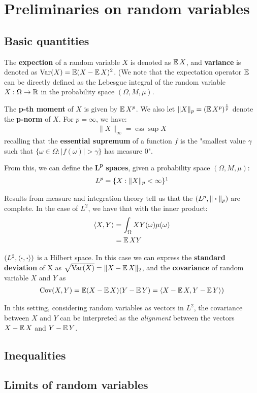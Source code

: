 \section{Preliminaries on random variables}
\subsection{Basic quantities}

The \textbf{expection} of a random variable $X$ is denoted as $\operatorname{\mathbb{E}} X$, and \textbf{variance} is denoted as $\operatorname{Var}(X) = \operatorname{\mathbb{E}} (X - \operatorname{\mathbb{E}} X)^2$. (We note that the expectation operator $\operatorname{\mathbb{E}}$ can be directly defined as the Lebesgue integral of the random variable $X: \Omega \rightarrow \mathbb{R}$ in the probability space $(\Omega, M, \mu)$.

The \textbf{p-th moment} of $X$ is given by $\operatorname{\mathbb{E}} X^p$. We also let $\|X\|_p = ( \operatorname{\mathbb{E}} X^p )^{\frac{1}{p}}$ denote the \textbf{p-norm} of $X$. For $p=\infty$, we have:
\begin{align}
    \|X\|_\infty = \operatorname{ess}\operatorname{sup}X \nonumber
\end{align}
recalling that the \textbf{essential supremum} of a function $f$ is the "smallest value $\gamma$ such that $\{\omega \in \Omega: |f(\omega)| > \gamma \}$ has measure 0".

From this, we can define the $\boldsymbol{L^p}$ \textbf{spaces}, given a probability space $(\Omega, M, \mu)$:
\begin{align}
    L^p = \{X : \|X\|_p < \infty\} \footnotemark \nonumber
\end{align}


Results from measure and integration theory tell us that the $(L^p, \|\boldsymbol{\cdot}\|_p)$ are complete. In the case of $L^2$, we have that with the inner product:
\begin{align}
    \langle X,Y \rangle &= \int_\Omega{XY(\omega)\mu(\omega)} \nonumber \\
    &= \operatorname{\mathbb{E}} XY \nonumber
\end{align}

$(L^2, \langle \boldsymbol{\cdot},\boldsymbol{\cdot} \rangle)$ is a Hilbert space. In this case we can express the \textbf{standard deviation} of X as $\sqrt{\operatorname{Var}(X)} = \|X - \operatorname{\mathbb{E}} X\|_2$, and the \textbf{covariance} of random variable $X$ and $Y$ as
\begin{align}
    \operatorname{Cov}(X,Y) = \operatorname{\mathbb{E}} (X - \operatorname{\mathbb{E}} X)(Y - \operatorname{\mathbb{E}} Y) = \langle X - \operatorname{\mathbb{E}} X, Y - \operatorname{\mathbb{E}} Y\rangle ) \nonumber
\end{align}

\begin{rmk}
In this setting, considering random variables as vectors in $L^2$, the covariance between $X$ and $Y$ can be interpreted as the \textit{alignment} between the vectors $X - \operatorname{\mathbb{E}} X$ and $Y - \operatorname{\mathbb{E}} Y$.

\end{rmk}

\subsection{Inequalities}
\subsection{Limits of random variables}